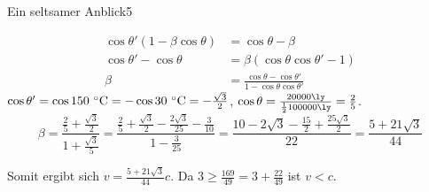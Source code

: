 \begin{problem}{Ein seltsamer Anblick}{5}
\begin{solution}
\begin{abcenum}
      \begin{align*}
        \cos\theta'(1-\beta\cos\theta)&=\cos\theta-\beta\\
        \cos\theta'-\cos\theta &= \beta(\cos\theta\cos\theta' -1)\\
        \beta &= \frac{\cos\theta-\cos\theta'}{1-\cos\theta\cos\theta'}
      \end{align*}
      $\cos\theta'=\cos 150\,\mathrm{\,^\circ\mathrm{C}}=-\cos 30\,\mathrm{\,^\circ\mathrm{C}}=-\frac {\sqrt{3}}2$, $\cos\theta=\frac{20000\ly}{\frac 12 100000\ly}=\frac 25$.
      \begin{equation*}
        \beta=\frac{\frac 25+\frac{\sqrt{3}}2}{1+\frac{\sqrt{3}}5}=\frac{\frac 25+\frac{\sqrt{3}}2-\frac{2\sqrt{3}}{25}-\frac 3{10}}{1-\frac 3{25}}=\frac{10-2\sqrt{3}-\frac{15}2+\frac{25\sqrt{3}}2}{22}=\frac{5+21\sqrt{3}}{44}
      \end{equation*}
  
  \end{abcenum}
  Somit ergibt sich $v=\frac{5+21\sqrt{3}}{44}c$.  Da $3\geq\frac{169}{49}=3+\frac{22}{49}$ ist $v<c$.
\end{solution}
\end{problem}


